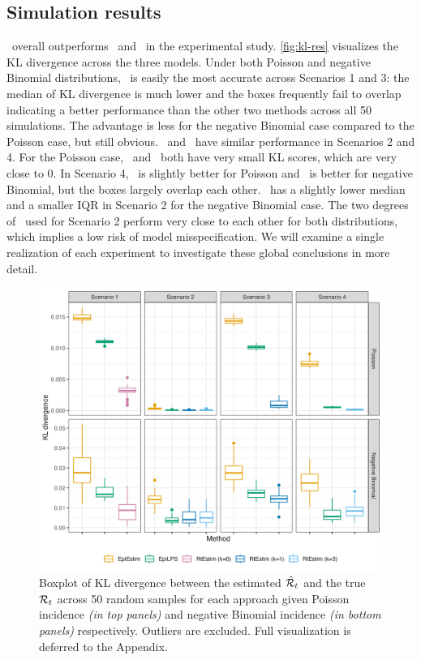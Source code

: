 \subsection{Simulation results}

\RtEstim\ overall outperforms \EpiEstim\ and \EpiLPS\ in the experimental study.
\autoref{fig:kl-res} visualizes the KL divergence across the three models. Under
both Poisson and negative Binomial distributions, \RtEstim\ is easily the most
accurate across Scenarios 1 and 3: the median of KL divergence is much lower
and the boxes frequently fail to overlap indicating a better performance than
the other two methods across all 50 simulations. 
The advantage is less for the
negative Binomial case compared to the Poisson case, but still obvious. 
% 
\RtEstim\ and \EpiLPS\ have similar performance in Scenarios 2 and 4. 
For the Poisson case, \RtEstim\ and \EpiLPS\ both have very small KL scores, which are
very close to 0. In Scenario 4, \RtEstim\ is slightly better for Poisson and \EpiLPS\ 
is better for negative Binomial, but the boxes largely overlap each other. 
\EpiLPS\ has a slightly lower median and a smaller IQR in Scenario 2 for the negative Binomial case. 
The two degrees of \RtEstim\ used for Scenario 2 perform very close to each other 
for both distributions, which implies a low risk of model misspecification. 
% 
We will examine a single
realization of each experiment to investigate these global conclusions in more
detail.

\begin{figure}[htb]
    \centering
    \includegraphics[width=.99\textwidth]{fig/KL_no_outlier.png}
    \caption{Boxplot of KL divergence between the estimated 
    $\hat{\mathcal{R}}_t$ and the true $\mathcal{R}_t$ across 50 random samples for 
    each approach given Poisson incidence \textit{(in top panels)} and negative 
    Binomial incidence \textit{(in bottom panels)} respectively.  
    Outliers are excluded. Full visualization is deferred to the Appendix.} 
    \label{fig:kl-res}
\end{figure}


